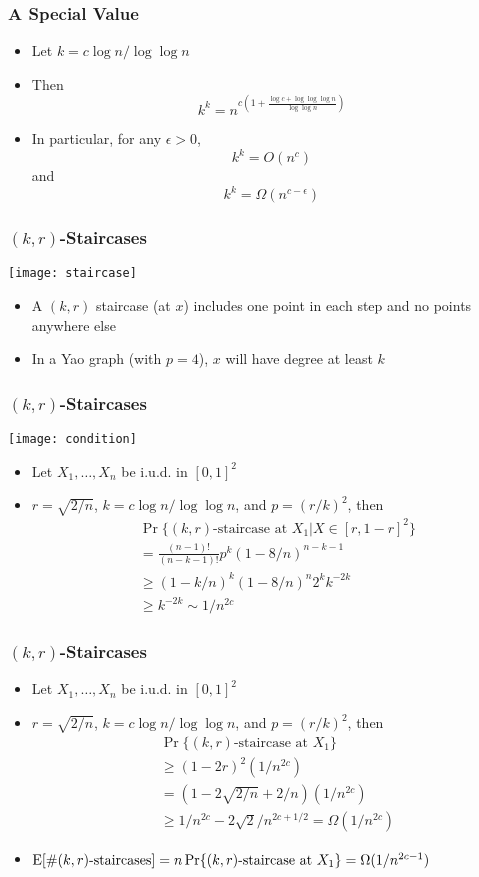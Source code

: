 \documentclass{beamer}
\begin{document}
\frame
{
  \frametitle{A Special Value}
  \begin{itemize}
    \item Let $k=c\log n / \log\log n$
    \item Then
     \[ k^k = n^{c(1 + \frac{\log c+\log\log\log n}{\log\log n})} \]
    \item In particular, for any $\epsilon > 0$,
     \[ k^k = O(n^c) \]
     and 
     \[ k^k = \Omega(n^{c-\epsilon}) \]
  \end{itemize}
}

\frame
{
  \frametitle{$(k,r)$-Staircases}

  \begin{center}
    \texttt{[image: staircase]}
  \end{center}
  \begin{itemize}
    \item A $(k,r)$ staircase (at $x$) includes one point in each step
          and no points anywhere else
    \item In a Yao graph (with $p=4$), $x$ will have degree at least $k$
  \end{itemize}
}


\frame
{
  \frametitle{$(k,r)$-Staircases}

  \begin{center}
      \texttt{[image: condition]} 
  \end{center}
  \begin{itemize}
    \item Let $X_1,\ldots,X_n$ be i.u.d. in $[0,1]^2$
    \item $r=\sqrt{2/n}$, $k=c\log n/\log\log n$, and $p=(r/k)^2$, then
    \[\begin{aligned}
      & \Pr\{\mbox{$(k,r)$-staircase at $X_1$}| X\in[r,1-r]^2\}  \\
       &  = \frac{(n-1)!}{(n-k-1)!} p^k (1-8/n)^{n-k-1} \\
       &  \ge (1-k/n)^k (1-8/n)^{n} 2^k k^{-2k} \\
       &  \ge k^{-2k} \sim 1/n^{2c}
      \end{aligned}
    \]
  \end{itemize}
}

\frame
{
  \frametitle{$(k,r)$-Staircases}

  \begin{itemize}
    \item Let $X_1,\ldots,X_n$ be i.u.d. in $[0,1]^2$
    \item $r=\sqrt{2/n}$, $k=c\log n/\log\log n$, and $p=(r/k)^2$, then
    \[\begin{aligned}
      & \Pr\{\mbox{$(k,r)$-staircase at $X_1$}\}  \\
       &  \ge (1-2r)^2 (1/n^{2c})  \\
       &  = (1-2\sqrt{2/n}+2/n)(1/n^{2c}) \\
       &  \ge 1/n^{2c} - 2\sqrt{2}/n^{2c+1/2} = \Omega(1/n^{2c})
      \end{aligned}
    \]
    \item $\mathrm{E}[\mbox{\#$(k,r)$-staircases}] = n\Pr\{\mbox{$(k,r)$-staircase at $X_1$}\}
      = \Omega(1/n^{2c-1}) $
  \end{itemize}
}
\end{document}
